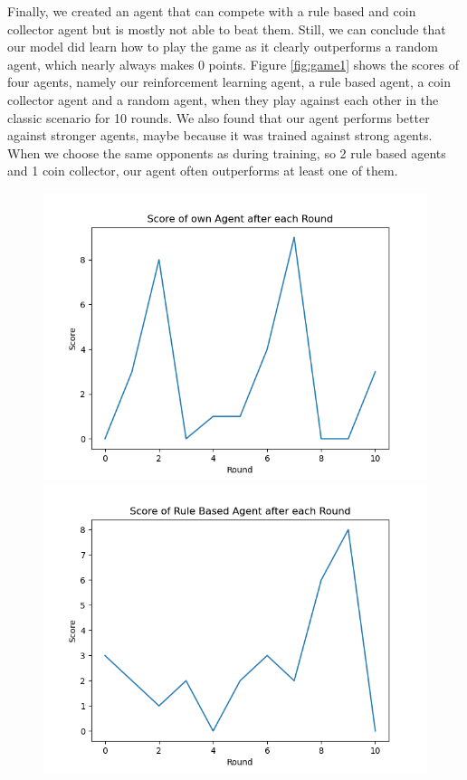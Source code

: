 Finally, we created an agent that can compete with a rule based and coin collector agent but is mostly not able to beat them. Still, we can conclude that our model did learn how to play the game as it clearly outperforms a random agent, which nearly always makes 0 points. Figure \ref{fig:game1} shows the scores of four agents, namely our reinforcement learning agent, a rule based agent, a coin collector agent and a random agent, when they play against each other in the classic scenario for 10 rounds. We also found that our agent performs better against stronger agents, maybe because it was trained against strong agents. When we choose the same opponents as during training, so 2 rule based agents and 1 coin collector, our agent often outperforms at least one of them.
\begin{figure}[H]
	\centering
	\begin{minipage}{0.49\textwidth}
		\centering
		\includegraphics[scale=0.52]{images/my_scores11_1.png}
	\end{minipage}
	\begin{minipage}{0.49\textwidth}
		\centering
		\includegraphics[scale=0.52]{images/rule_scores11_1.png}

\end{minipage}
\end{figure}
